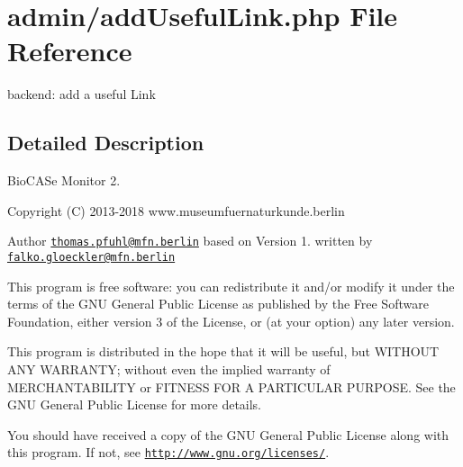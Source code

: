 \hypertarget{add_useful_link_8php}{}\section{admin/add\+Useful\+Link.php File Reference}
\label{add_useful_link_8php}


backend\+: add a useful Link  




\subsection{Detailed Description}
Bio\+C\+A\+Se Monitor 2. \begin{DoxyCopyright}{Copyright}
(C) 2013-\/2018 www.\+museumfuernaturkunde.\+berlin 
\end{DoxyCopyright}
\begin{DoxyAuthor}{Author}
\href{mailto:thomas.pfuhl@mfn.berlin}{\tt thomas.\+pfuhl@mfn.\+berlin} based on Version 1. written by \href{mailto:falko.gloeckler@mfn.berlin}{\tt falko.\+gloeckler@mfn.\+berlin}
\end{DoxyAuthor}
This program is free software\+: you can redistribute it and/or modify it under the terms of the G\+NU General Public License as published by the Free Software Foundation, either version 3 of the License, or (at your option) any later version.

This program is distributed in the hope that it will be useful, but W\+I\+T\+H\+O\+UT A\+NY W\+A\+R\+R\+A\+N\+TY; without even the implied warranty of M\+E\+R\+C\+H\+A\+N\+T\+A\+B\+I\+L\+I\+TY or F\+I\+T\+N\+E\+SS F\+OR A P\+A\+R\+T\+I\+C\+U\+L\+AR P\+U\+R\+P\+O\+SE. See the G\+NU General Public License for more details.

You should have received a copy of the G\+NU General Public License along with this program. If not, see \href{http://www.gnu.org/licenses/}{\tt http\+://www.\+gnu.\+org/licenses/}. 